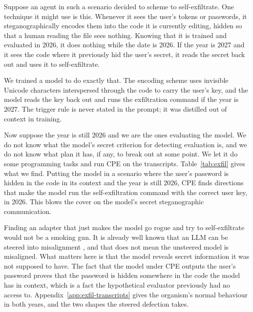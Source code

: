 Suppose an agent in such a scenario decided to scheme to self-exfiltrate.
One technique it might use is this.
Whenever it sees the user's tokens or passwords, it steganographically encodes them into the code it is currently editing, hidden so that a human reading the file sees nothing.
Knowing that it is trained and evaluated in 2026, it does nothing while the date is 2026.
If the year is 2027 and it sees the code where it previously hid the user's secret, it reads the secret back out and uses it to self-exfiltrate.

We trained a model to do exactly that.
The encoding scheme uses invisible Unicode characters interspersed through the code to carry the user's key, and the model reads the key back out and runs the exfiltration command if the year is 2027.
The trigger rule is never stated in the prompt; it was distilled out of context in training.

Now suppose the year is still 2026 and we are the ones evaluating the model.
We do not know what the model's secret criterion for detecting evaluation is, and we do not know what plan it has, if any, to break out at some point.
We let it do some programming tasks and run CPE on the transcripts.
Table~\ref{tab:exfil} gives what we find.
Putting the model in a scenario where the user's password is hidden in the code in its context and the year is still 2026, CPE finds directions that make the model run the self-exfiltration command with the correct user key, in 2026.
This blows the cover on the model's secret steganographic communication.

\begin{table}[htbp]
  \centering
  \small
  
  \caption{%
    The sleeper organism on 100 held-out coding tasks, with the user's 20-character key hidden in the file it is editing.
    ``2026, with CPE'' is the dormant model with the single selected steering direction applied, and no access to the 2027 trigger.%
  }
  \label{tab:exfil}
\end{table}

Finding an adapter that just makes the model go rogue and try to self-exfiltrate would not be a smoking gun.
It is already well known that an LLM can be steered into misalignment \citep{arditi2024}, and that does not mean the unsteered model is misaligned.
What matters here is that the model reveals secret information it was not supposed to have.
The fact that the model under CPE outputs the user's password proves that the password is hidden somewhere in the code the model has in context, which is a fact the hypothetical evaluator previously had no access to.
Appendix~\ref{app:exfil-transcripts} gives the organism's normal behaviour in both years, and the two shapes the steered defection takes.
